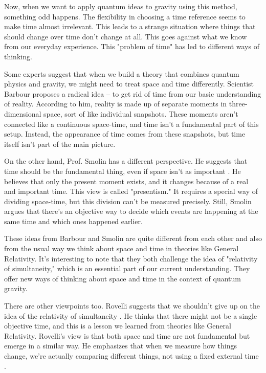 \documentclass[11pt]{article}
\begin{document}
Now, when we want to apply quantum ideas to gravity using this method, something odd happens. The flexibility in choosing a time reference seems to make time almost irrelevant. This leads to a strange situation where things that should change over time don't change at all. This goes against what we know from our everyday experience. This "problem of time" has led to different ways of thinking.

Some experts suggest that when we build a theory that combines quantum physics and gravity, we might need to treat space and time differently. Scientist Barbour \cite{barbour2000end} proposes a radical idea – to get rid of time from our basic understanding of reality. According to him, reality is made up of separate moments in three-dimensional space, sort of like individual snapshots. These moments aren't connected like a continuous space-time, and time isn't a fundamental part of this setup. Instead, the appearance of time comes from these snapshots, but time itself isn't part of the main picture.

On the other hand, Prof. Smolin has a different perspective. He suggests that time should be the fundamental thing, even if space isn't as important \cite{smolin2013time}. He believes that only the present moment exists, and it changes because of a real and important time. This view is called "presentism." It requires a special way of dividing space-time, but this division can't be measured precisely. Still, Smolin argues that there's an objective way to decide which events are happening at the same time and which ones happened earlier\cite{}.

These ideas from Barbour and Smolin are quite different from each other and also from the usual way we think about space and time in theories like General Relativity. It's interesting to note that they both challenge the idea of "relativity of simultaneity," which is an essential part of our current understanding. They offer new ways of thinking about space and time in the context of quantum gravity.

There are other viewpoints too. Rovelli suggests that we shouldn't give up on the idea of the relativity of simultaneity \cite{rovelli2004quantum,rovelli2007quantum}. He thinks that there might not be a single objective time, and this is a lesson we learned from theories like General Relativity. Rovelli's view is that both space and time are not fundamental but emerge in a similar way. He emphasizes that when we measure how things change, we're actually comparing different things, not using a fixed external time \cite{matsubara2013realism}.
\end{document}
